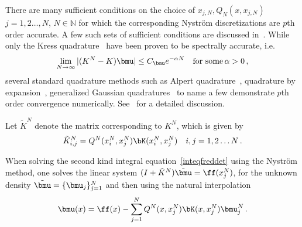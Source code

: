 \begin{remark}
There are many sufficient conditions on
the choice of $x_{j,N}, Q_{N}(x,x_{j,N})$ $j=1,2\ldots,N$, $N \in \mathbb{N}$
for which the corresponding Nystr\"{o}m discretizations are $p$th order accurate.
A few such sets of sufficient conditions are discussed in~\cite{kress1989linear}.
While only the Kress quadrature~\cite{kress1991boundary} have been proven to be 
spectrally 
accurate, i.e.
\begin{equation}
\lim_{N\to\infty} |(K^{N}-K)\bmu| \leq C_{\bmu} e^{-\alpha N} \quad \text{for some} \, \alpha>0 \, ,
\end{equation}
several standard quadrature methods such as 
Alpert quadrature~\cite{alpert1999}, quadrature by expansion~\cite{qbxquadrature}, 
generalized Gaussian quadratures~\cite{bremer2010}
to name a few demonstrate $p$th order convergence numerically. 
See~\cite{hao2014high} for a detailed discussion. 
\end{remark}

Let $\tilde{K}^{N}$ denote the matrix  
corresponding to $K^{N}$, which is given by
\begin{equation}
\tilde{K}^{N}_{i,j} = Q^{N}(x_{i}^{N}, x_{j}^{N}) \bK(x_{i}^{N}, x_{j}^{N})
\quad i,j=1,2\ldots N \, .
\end{equation}

\begin{remark}
When solving the second kind integral equation~\cref{inteqfreddet} using the Nystr\"{o}m 
method, one solves the linear system $(I + \tilde{K}^{N})\tilde{\bmu} = \ff(x_{j}^{N})$,
for the unknown density $\tilde{\bmu} = \{ \bmu_{j} \}_{j=1}^{N}$ 
and then using the natural interpolation
\begin{equation}
\bmu(x) = \ff(x) - \sum_{j=1}^{N} Q^{N}(x,x_{j}^{N}) \bK(x,x_{j}^{N}) \bmu_{j}^{N} \, .
\end{equation}
\end{remark}



